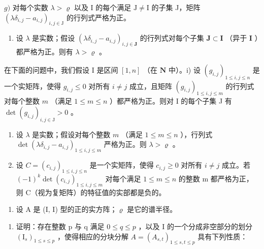 \(g)\) 对每个实数 \(\lambda >\varrho\) 以及 I 的每个满足 \(\mathrm{J}\neq \mathrm{I}\) 的子集 J，矩阵 \((\lambda \delta_{i,j} - a_{i,j})_{i,j\in \mathrm{J}}\) 的行列式严格为正。

\begin{enumerate}
\def\labelenumi{\alph{enumi})}
\setcounter{enumi}{7}
\tightlist
\item
  设 \(\lambda\) 是实数；假设 \((\lambda \delta_{i,j} - a_{i,j})_{i,j \in \mathbf{J}}\) 的行列式对每个子集 \(\mathbf{J} \subset \mathbf{I}\) （异于 \(\mathbf{I}\) ）都严格为正。则有 \(\lambda > \varrho\) 。
\end{enumerate}

在下面的问题中，我们假设 \(\mathrm{I}\) 是区间 \([1,n]\) （在 \(\mathbf{N}\) 中）。i) 设 \((g_{i,j})_{1\leqslant i,j\leqslant n}\) 是一个实矩阵，使得 \(g_{i,j}\leqslant0\) 对所有 \(i\neq j\) 成立，且矩阵 \((g_{i,j})_{1\leqslant i,j\leqslant m}\) 的行列式对每个整数 \(m\) （满足 \(1\leqslant m\leqslant n\) ）都严格为正。则对 I 的每个子集 J 有 \(\det(g_{i,j})_{i,j\in\mathrm{J}}>0\) 。

\begin{enumerate}
\def\labelenumi{\alph{enumi})}
\setcounter{enumi}{9}
\item
  设 \(\lambda\) 是实数；假设对每个整数 \(m\) （满足 \(1 \leqslant m \leqslant n\) ），行列式 \(\det(\lambda \delta_{i,j} - a_{i,j})_{1 \leqslant i,j \leqslant m}\) 严格为正。则 \(\lambda > \varrho\) 。
\item
  设 \(C = (c_{i,j})_{1 \leqslant i,j \leqslant n}\) 是一个实矩阵，使得 \(c_{i,j} \geqslant 0\) 对所有 \(i \neq j\) 成立。若 \((-1)^{k} \det(c_{i,j})_{1 \leqslant i,j \leqslant m}\) 对每个满足 \(1 \leqslant m \leqslant n\) 的整数 m 都严格为正，则 C（视为复矩阵）的特征值的实部都是负的。
\end{enumerate}

\begin{enumerate}
\def\labelenumi{\arabic{enumi})}
\setcounter{enumi}{20}
\tightlist
\item
  设 A 是 (I, I) 型的正的实方阵；\(\varrho\) 是它的谱半径。
\end{enumerate}

\begin{enumerate}
\def\labelenumi{\alph{enumi})}
\tightlist
\item
  证明：存在整数 p 与 q 满足 \(0 \leqslant q \leqslant p\) ，以及 I 的一个分成非空部分的划分 \((\mathrm{I}_{s})_{1 \leqslant s \leqslant p}\) ，使得相应的分块分解 \(A = (A_{s,t})_{1 \leqslant s, t \leqslant p}\) 具有下列性质：
\end{enumerate}

